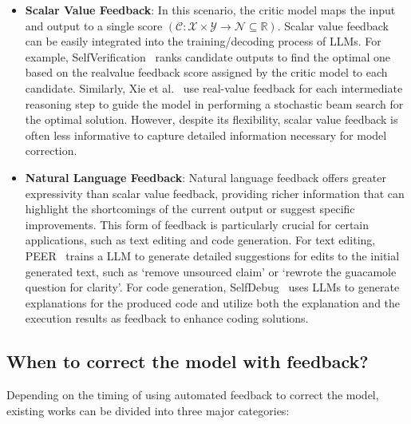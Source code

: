 \documentclass[a4paper,oneside]{book}
\begin{document}
\begin{itemize}
    \item \textbf{Scalar Value Feedback}: In this scenario, the critic model maps the input and output to a single score $(\mathcal{C}: \mathcal{X} \times \mathcal{Y} \rightarrow \mathcal{N} \subseteq \mathbb{R})$. Scalar value feedback can be easily integrated into the training/decoding process of LLMs. For example, SelfVerification~\cite{weng2023large} ranks candidate outputs to find the optimal one based on the realvalue feedback score assigned by the critic model to each candidate. Similarly, Xie et al.~\cite{xie2023selfevaluation} use real-value feedback for each intermediate reasoning step to guide the model in performing a stochastic beam search for the optimal solution. However, despite its flexibility, scalar value feedback is often less informative to capture detailed information necessary for model correction.

    \item \textbf{Natural Language Feedback}: Natural language feedback offers greater expressivity than scalar value feedback, providing richer information that can highlight the shortcomings of the current output or suggest specific improvements. This form of feedback is particularly crucial for certain applications, such as text editing and code generation. For text editing, PEER~\cite{schick2022peer} trains a LLM to generate detailed suggestions for edits to the initial generated text, such as `remove unsourced claim' or `rewrote the guacamole question for clarity'. For code generation, SelfDebug~\cite{chen2023teaching} uses LLMs to generate explanations for the produced code and utilize both the explanation and the execution results as feedback to enhance coding solutions.
\end{itemize}

\subsection{When to correct the model with feedback?}
Depending on the timing of using automated feedback to correct the model, existing works can be divided into three major categories:
\end{document}
